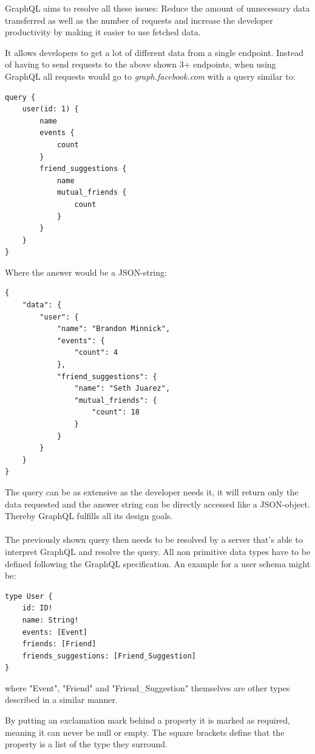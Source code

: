GraphQL aims to resolve all these issues: Reduce the amount of unnecessary data transferred as well as the number of requests and increase the developer productivity by making it easier to use fetched data. \cite{EngineeringFB}

It allows developers to get a lot of different data from a single endpoint. Instead of having to send requests to the above shown 3+ endpoints, when using GraphQL all requests would go to \emph{graph.facebook.com} with a query similar to: \\
\newpage
\lstset{language=GraphQL}
\begin{lstlisting}[caption={A GraphQL Query to Fetch User Data \citep[with adaptions]{GraphQLIntro}},label={ex211}]
query {
	user(id: 1) {
		name
		events {
			count
		}
		friend_suggestions {
			name
			mutual_friends {
				count
			}
		}
	}
}
\end{lstlisting}
	
Where the answer would be a JSON-string:
\begin{lstlisting}[caption={Example Response Data \citep[with adaptions]{GraphQLIntro}},label={ex212}]
{ 
	"data": {
		"user": {
			"name": "Brandon Minnick",
			"events": {
				"count": 4
			},
			"friend_suggestions": {
				"name": "Seth Juarez",
				"mutual_friends": {
					"count": 18 
				}
			}
		}
	}
}
\end{lstlisting}

The query can be as extensive as the developer needs it, it will return only the data requested and the answer string can be directly accessed like a JSON-object. Thereby GraphQL fulfills all its design goals.
\\ \\
The previously shown query then needs to be resolved by a server that's able to interpret GraphQL and resolve the query. All non primitive data types have to be defined following the GraphQL specification. An example for a user schema might be:
\newpage
\begin{lstlisting}[caption={Type Definition in GraphQL}]
type User {
	id: ID! 
	name: String! 
	events: [Event] 
	friends: [Friend] 
	friends_suggestions: [Friend_Suggestion] 
}
\end{lstlisting}

\noindent
where "Event", "Friend" and "Friend\_Suggestion" themselves are other types described in a similar manner.

By putting an exclamation mark behind a property it is marked as required, meaning it can never be null or empty. The square brackets define that the property is a list of the type they surround.

